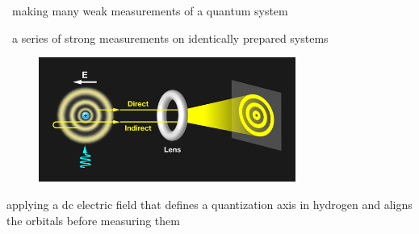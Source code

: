 
\xmark \ making many weak measurements of a quantum system

\cmark \  a series of strong measurements on identically prepared systems 

\begin{figure}[h]
    \centering
    \includegraphics[width=0.75\textwidth]{figures/1.png}
\end{figure}


\cmark applying a dc electric field that defines a quantization axis in hydrogen and aligns the orbitals before measuring them